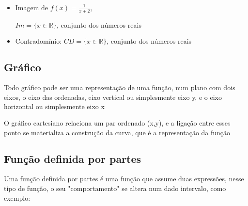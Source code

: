 \begin{multicols*}{2}
\begin{itemize}[wide, labelwidth=!, labelindent=0pt]
        \item Imagem de $f(x) = \frac{1}{x+2}$,

              $Im = \{x \in \mathbb{R} \}$, conjunto dos números reais

        \item Contradomínio: $CD = \{x \in \mathbb{R} \}$, conjunto dos números reais
    \end{itemize}

    \subsection*{Gráfico}
    Todo gráfico pode ser uma representação de uma função, num plano com dois eixos, o eixo das 			ordenadas, eixo vertical ou simplesmente eixo y, e o eixo horizontal ou simplesmente eixo x

    O gráfico cartesiano relaciona um par ordenado (x,y), e a ligação entre esses ponto se 					materializa a construção da curva, que é a representação da função




    \subsection*{Função definida por partes}
    Uma função definida por partes é uma função que assume duas expressões, nesse tipo de função, o 		seu "comportamento" se altera num dado intervalo, como exemplo:


\end{multicols*}

